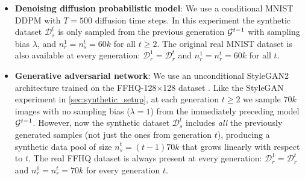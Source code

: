 \documentclass{article}
\def\bias{{\lambda}}
\def\data{\mathcal{D}}
\begin{document}
\begin{itemize}
    \item \textbf{Denoising diffusion probabilistic model}: We use a conditional MNIST DDPM \cite{ddpm} with $T = 500$ diffusion time steps. In this experiment the synthetic dataset $\data_s^t$ is only sampled from the previous generation $\mathcal{G}^{t-1}$ with sampling bias $\bias$, and $n_r^1 = n_s^t = 60k$ for all $t \ge 2$. The original real MNIST dataset is also available at every generation: $\data_r^1 = \data_r^t$ and $n_r^1 = n_r^t = 60k$ for all $t$.
    
    \item \textbf{Generative adversarial network}: We use an unconditional StyleGAN2 architecture \cite{Karras2019stylegan2} trained on the FFHQ-128$\times$128 dataset \cite{kass1997geometrical}. Like the StyleGAN experiment in \cref{sec:synthetic_setup}, at each generation $t \ge 2$ we sample $70k$ images with no sampling bias ($\bias = 1$) from the immediately preceding model $\mathcal{G}^{t-1}$. However, now the synthetic dataset $\data^t_s$ includes \textit{all} the previously generated samples (not just the ones from generation $t$), producing a synthetic data pool of size $n^t_s = (t-1)70k$ that grows linearly with respect to $t$. %
    The real FFHQ dataset is always present at every generation: $\data_r^1 = \data_r^t$ and $n_r^1 = n_r^t = 70k$ for every generation $t$. 
\end{itemize}
\end{document}
